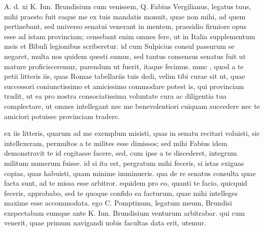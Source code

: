 


 A. d. xi K. Iun. Brundisium cum venissem, Q. Fabius Vergilianus, legatus tuus, mihi praesto fuit eaque me ex tuis mandatis monuit, quae non mihi, ad quem pertinebant, sed universo senatui venerant in mentem, praesidio firmiore opus esse ad istam provinciam; censebant enim omnes fere, ut in Italia supplementum meis et Bibuli legionibus scriberetur. id cum Sulpicius consul passurum se negaret, multa nos quidem questi sumus, sed tantus consensus senatus fuit ut mature proficisceremur, parendum ut fuerit, itaque fecimus. nunc , quod a te petii litteris iis, quas Romae tabellariis tuis dedi, velim tibi curae sit ut, quae successori coniunctissimo et amicissimo commodare potest is, qui provinciam tradit, ut ea pro nostra consociatissima voluntate cura ac diligentia tua complectare, ut omnes intellegant nec me benevolentiori cuiquam succedere nec te amiciori potuisse provinciam tradere.

 ex iis litteris, quarum ad me exemplum misisti, quas in senatu recitari voluisti, sic intellexeram, permultos a te milites esse dimissos; sed mihi Fabius idem demonstravit te id cogitasse facere, sed, cum ipse a te discederet, integrum militum numerum fuisse. id si ita est, pergratum mihi feceris, si istas exiguas copias, quas habuisti, quam minime imminueris. qua de re senatus consulta quae facta sunt, ad te missa esse arbitror. equidem pro eo, quanti te facio, quicquid feceris, approbabo, sed te quoque confido ea facturum, quae mihi intelleges maxime esse accommodata. ego C. Pomptinum, legatum meum, Brundisi exspectabam eumque ante K. Iun. Brundisium venturum arbitrabar. qui cum venerit, quae primum navigandi nobis facultas data erit, utemur.
